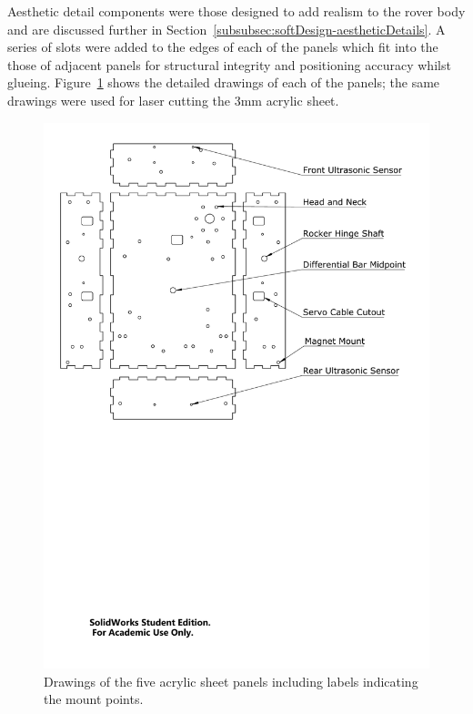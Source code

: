       Aesthetic detail components were those designed to add realism to the rover body and are discussed further in Section~\ref{subsubsec:softDesign-aestheticDetails}. A series of slots were added to the edges of each of the panels which fit into the those of adjacent panels for structural integrity and positioning accuracy whilst glueing. Figure~\ref{fig:mechDesign-perspex} shows the detailed drawings of each of the panels; the same drawings were used for laser cutting the 3mm acrylic sheet.
      
      \begin{figure}[h!]
        \centering
        \includegraphics[clip, trim=0cm 13cm 1cm 0cm, width=1\linewidth]{figures/perspex}
        \caption[Drawings of the five acrylic sheet panels including labels indicating the mount points.]{Drawings of the five acrylic sheet panels including labels indicating the mount points.}
        \label{fig:mechDesign-perspex}
      \end{figure}
      
